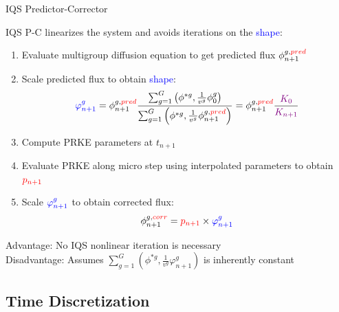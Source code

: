 \documentclass[8pt,xcolor=dvipnames]{beamer}
\newcommand{\ben}{\begin{enumerate}}
\newcommand{\een}{\end{enumerate}}
\newcommand{\tcr}[1]{\textcolor{red}{#1}}
\newcommand{\tcb}[1]{\textcolor{blue}{#1}}
\newcommand{\tcp}[1]{\textcolor{violet}{#1}}
\begin{document}
\begin{frame}{IQS Predictor-Corrector}

IQS P-C linearizes the system and avoids iterations on the \tcb{shape}: 
\ben
\item Evaluate multigroup diffusion equation to get predicted flux $\phi_{n+1}^{g,\tcr{pred}}$
\item Scale predicted flux to obtain \tcb{shape}:
\[
\tcb{\varphi^{g}_{n+1}} = \phi_{n+1}^{g,\tcr{pred}} \frac{\sum_{g=1}^G\left(\phi^{*g},\frac{1}{v^g}\phi ^g_{0}\right)}{\sum_{g=1}^G \left(\phi^{*g},\frac{1}{v^g}\phi_{n+1}^{g,\tcr{pred}}\right)} = \phi_{n+1}^{g,\tcr{pred}} \frac{\tcp{K_0}}{\tcp{K_{n+1}}}
\]
\item Compute PRKE parameters at $t_{n+1}$
\item Evaluate PRKE along micro step using interpolated parameters to obtain $\tcr{p_{n+1}}$
\item Scale $\tcb{\varphi^{g}_{n+1}}$ to obtain corrected flux:
\[
\phi_{n+1}^{g,\tcr{corr}} = \tcr{p_{n+1}} \times \tcb{\varphi^{g}_{n+1}}
\]
\een

 Advantage: No IQS nonlinear iteration is necessary \\
 Disadvantage: Assumes $\sum_{g=1}^G\left(\phi^{*g},\frac{1}{v^g}\varphi^g_{n+1}\right)$ is inherently constant \\

\end{frame}

\subsection{Time Discretization}
\end{document}
